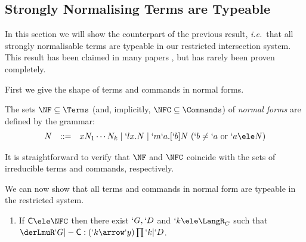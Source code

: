 \documentclass{lmcs}
\def\ie{\emph{i.e.}}
\begin{document}
 \subsection{Strongly Normalising Terms are Typeable} \label{sub:NormType}

In this section we will show the counterpart of the previous result, \ie~that all strongly normalisable terms are typeable in our restricted intersection system.
This result has been claimed in many papers \cite{Pottinger'80,Bakel-TCS'92}, but has rarely been proven completely.

First we give the shape of terms and commands in normal forms.

 \begin{defi} 
The sets $\NF \subseteq \Terms$ (and, implicitly, $\NFC\subseteq \Commands$) of \emph{normal forms} are defined by the grammar:
%
 \[ \begin{array}{rcl}
N & :: =& x N_1 \cdots N_k \mid `lx.N \mid `m`a.[`b]N ~ (`b \not= `a \textrm{ or } `a \ele N %
) 
 \end{array} \]
 \end{defi}

\noindent
It is straightforward to verify that $\NF$ and $\NFC$ coincide with the sets of irreducible terms and commands, respectively.

We can now show that all terms and commands in normal form are typeable in the restricted system.

 \begin{lem} \label{prop:NFaretypeable}

 \begin{enumerate}

 \firstitem \label{prop:NFaretypeable-terms}
If $N \ele \NF$ then there exist $`G,`D $ and $`k\arrow `y \ele \LangR_D$ such that $ \derLmuR `G |- N : `k\arrow `y | `D $.

 \item \label{prop:NFaretypeable-commands}
If ${\Cmd} \ele \NFC$ then there exist $`G,`D $ and $`k \ele \LangR_C$ such that $ \derLmuR `G |- {\Cmd} : (`k\arrow `y)\prod `k | `D $.

 \end{enumerate}
 \end{lem}
\end{document}
